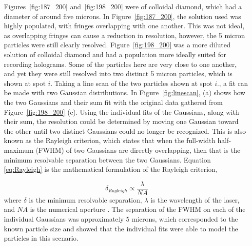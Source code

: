 Figures~\ref{fig:187_200} and~\ref{fig:198_200} were of colloidal diamond,
which had a diameter of around five microns. In Figure~\ref{fig:187_200}, the
solution used was highly populated, with fringes overlapping with one another.
This was not ideal, as overlapping fringes can cause a reduction in
resolution, however, the 5 micron particles were still clearly resolved.
Figure~\ref{fig:198_200} was a more diluted solution of colloidal diamond and
had a population more ideally suited for recording holograms. Some of the
particles here are very close to one another, and yet they were still resolved
into two distinct 5 micron particles, which is shown at spot $i$. Taking a line
scan of the two particles shown at spot $i.$, a fit can be made with two
Gaussian distributions. In Figure~\ref{fig:linescan}, (a) shows how the two
Gaussians and their sum fit with the original data gathered from Figure~\ref{fig:198_200}
(c). Using the individual fits of the Gaussians, along with their sum, the resolution could be
determined by moving one Gaussian toward the other until two distinct Gaussians
could no longer be recognized. This is also known as the Rayleigh
criterion, which states that when the full-width half-maximum (FWHM) of two Gaussians
are directly overlapping, then that is the minimum resolvable separation
between the two Gaussians. Equation \ref{eq:Rayleigh} is the mathematical
formulation of the Rayleigh criterion,

\begin{equation}
    \delta_{Rayleigh} \propto \frac{\lambda}{NA}
    \label{eq:Rayleigh}
\end{equation}
%
where $\delta$ is the minimum resolvable separation, $\lambda$ is the
wavelength of the laser, and $NA$ is the numerical aperture \cite{Goodman}.
The separation of the FWHM on each of the individual Gaussians was
approximately 5 microns, which corresponded to the known particle size and
showed that the individual fits were able to model the particles in this
scenario.


